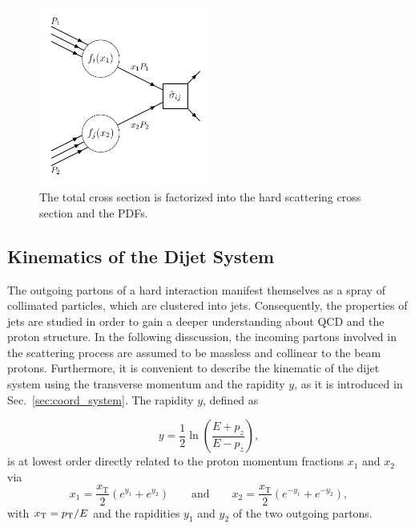 \begin{figure}[htbp]
    \centering
    \includegraphics[width=0.5\textwidth]{figures/drawings/hardscattering.pdf}
    \caption[Factorization of hard scattering cross section.]
        {The total cross section is factorized into the hard scattering cross
        section and the PDFs.}
    \label{fig:crosssection_factorization}
\end{figure}

\subsection{Kinematics of the Dijet System}
\label{sec:dijet_kinematics}

The outgoing partons of a hard interaction manifest themselves as a spray of
collimated particles, which are clustered into jets. Consequently, the
properties of jets are studied in order to gain a deeper understanding about
QCD and the proton structure. In the following disscussion, the incoming partons
involved in the scattering process are assumed to be massless and collinear to
the beam protons. Furthermore, it is convenient to describe the kinematic of
the dijet system using the transverse momentum \pt and the rapidity $y$, as it
is introduced in Sec.~\ref{sec:coord_system}. The rapidity $y$, defined as

\begin{equation*}
    y = \frac{1}{2} \ln \left( \frac{E+p_z}{E-p_z} \right),
\end{equation*}
%
is at lowest order directly related to the proton momentum fractions $x_1$ and
$x_2$ via
%
\begin{equation*}
    x_1 = \frac{x_\mathrm{T}}{2} \left( e^{y_1} + e^{y_2} \right)
    \qquad\text{and}\qquad x_2 = \frac{x_\mathrm{T}}{2} \left( e^{-y_1} +
    e^{-y_2} \right),
\end{equation*}
%
with $x_{\mathrm{T}} = p_{\mathrm{T}}/E$ and the rapidities $y_1$ and $y_2$ of the
two outgoing partons.


